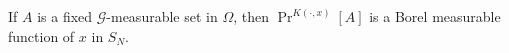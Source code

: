 If $A$ is a fixed $\mathcal{G}$-measurable set in $\Omega$, then $\Pr^{K(\cdot, x)}[A]$ is a Borel measurable function of $x$ in $S_N$.